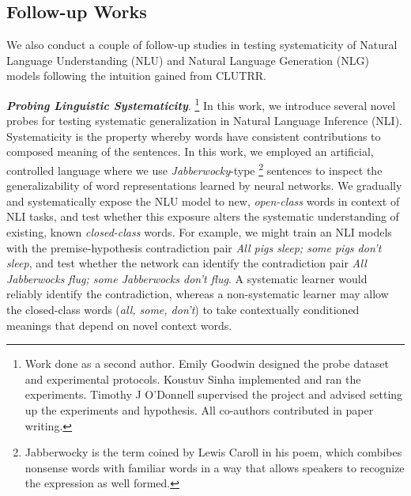 \documentclass[12pt]{article}
\newcommand{\xhdr}[1]{{\noindent\bfseries #1}.}
\begin{document}
\subsection{Follow-up Works}

We also conduct a couple of follow-up studies in testing systematicity of Natural Language Understanding (NLU) and Natural Language Generation (NLG) models following the intuition gained from CLUTRR.

\xhdr{\textit{Probing Linguistic Systematicity}} \cite{goodwin2020} \footnote{Work done as a second author. Emily Goodwin designed the probe dataset and experimental protocols. Koustuv Sinha implemented and ran the experiments. Timothy J O'Donnell supervised the project and advised setting up the experiments and hypothesis. All co-authors contributed in paper writing.} In this work, we introduce several novel probes for testing systematic generalization in Natural Language Inference (NLI). Systematicity is the property whereby words have consistent contributions to composed meaning of the sentences. In this work, we employed an artificial, controlled language where we use \textit{Jabberwocky}-type \footnote{Jabberwocky is the term coined by Lewis Caroll in his poem, which combibes nonsense words with familiar words in a way that allows speakers to recognize the expression as well formed.} sentences to inspect the generalizability of word representations learned by neural networks. We gradually and systematically expose the NLU model to new, \textit{open-class} words in context of NLI tasks, and test whether this exposure alters the systematic understanding of existing, known \textit{closed-class} words. For example, we might train an NLI models with the premise-hypothesis contradiction pair \textit{All pigs sleep; some pigs don't sleep}, and test whether the network can identify the contradiction pair \textit{All Jabberwocks flug; some Jabberwocks don't flug}. A systematic learner would reliably identify the contradiction, whereas a non-systematic learner may allow the closed-class words (\textit{all, some, don't}) to take contextually conditioned meanings that depend on novel context words.


\end{document}

